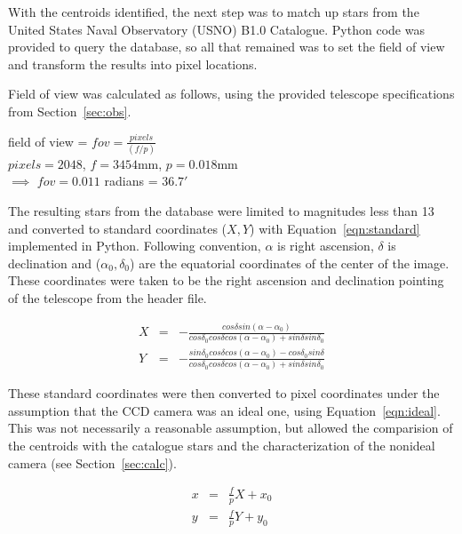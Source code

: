 \documentclass[a4paper,12pt]{article}
\begin{document}
With the centroids identified, the next step was to match up stars from the United States Naval Observatory (USNO) B1.0 Catalogue. Python code was provided to query the database, so all that remained was to set the field of view and transform the results into pixel locations.

Field of view was calculated as follows, using the provided telescope specifications from Section~\ref{sec:obs}.
\begin{center}
field of view = $fov = \frac{pixels}{(f/p)}$\\
$pixels = 2048$, $f = 3454$mm, $p = 0.018$mm\\
$\implies$ $fov = 0.011$ radians = $36.7'$
\end{center}

The resulting stars from the database were limited to magnitudes less than 13 and converted to standard coordinates ($X,Y$) with Equation~\ref{eqn:standard} implemented in Python. Following convention, $\alpha$ is right ascension, $\delta$ is declination and ($\alpha_{0},\delta_{0}$) are the equatorial coordinates of the center of the image. These coordinates were taken to be the right ascension and declination pointing of the telescope from the header file.

\begin{equation}
\begin{array}{ccl}
X &=& -\frac{cos\delta sin(\alpha-\alpha_{0})}{cos\delta_{0}cos\delta cos(\alpha-\alpha_{0})+sin\delta sin\delta_{0}}\\
Y &=& -\frac{sin\delta_{0}cos\delta cos(\alpha-\alpha_{0})-cos\delta_{0}sin\delta}{cos\delta_{0}cos\delta cos(\alpha-\alpha_{0})+sin\delta sin\delta_{0}}
\end{array}
\label{eqn:standard}
\end{equation}

These standard coordinates were then converted to pixel coordinates under the assumption that the CCD camera was an ideal one, using Equation~\ref{eqn:ideal}. This was not necessarily a reasonable assumption, but allowed the comparision of the centroids with the catalogue stars and the characterization of the nonideal camera (see Section~\ref{sec:calc}).

\begin{equation}
\begin{array}{ccl}
x &=& \frac{f}{p}X+x_{0}\\
y &=& \frac{f}{p}Y+y_{0}
\end{array}
\label{eqn:ideal}
\end{equation}
\end{document}
